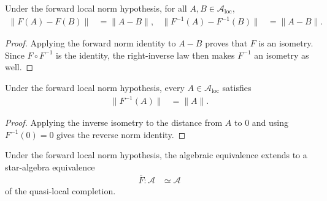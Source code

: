 \begin{lemma}
    \label{lem:qca_compatible_algebraic_isometry}
    \leanok
    Under the forward local norm hypothesis, for all
    $A,B\in\mathcal A_{\mathrm{loc}}$,
    \begin{align}
        \lVert F(A)-F(B)\rVert           & =\lVert A-B\rVert, &
        \lVert F^{-1}(A)-F^{-1}(B)\rVert & =\lVert A-B\rVert.
    \end{align}
\end{lemma}

\begin{proof}\leanok
    Applying the forward norm identity to $A-B$ proves that $F$ is an isometry.
    Since $F\circ F^{-1}$ is the identity, the right-inverse law then makes
    $F^{-1}$ an isometry as well.
\end{proof}

\begin{lemma}
    \label{lem:qca_compatible_algebraic_inverse_norm}
    \leanok
    Under the forward local norm hypothesis, every
    $A\in\mathcal A_{\mathrm{loc}}$ satisfies
    \begin{align}
        \lVert F^{-1}(A)\rVert & =\lVert A\rVert.
    \end{align}
\end{lemma}

\begin{proof}\leanok
    Applying the inverse isometry to the distance from $A$ to $0$ and using
    $F^{-1}(0)=0$ gives the reverse norm identity.
\end{proof}

\begin{definition}
    \label{def:qca_compatible_quasi_local_equiv}
    \leanok
    Under the forward local norm hypothesis, the algebraic equivalence extends
    to a star-algebra equivalence
    \begin{align}
        \overline F\colon\mathcal A & \simeq\mathcal A
    \end{align}
    of the quasi-local completion.
\end{definition}

